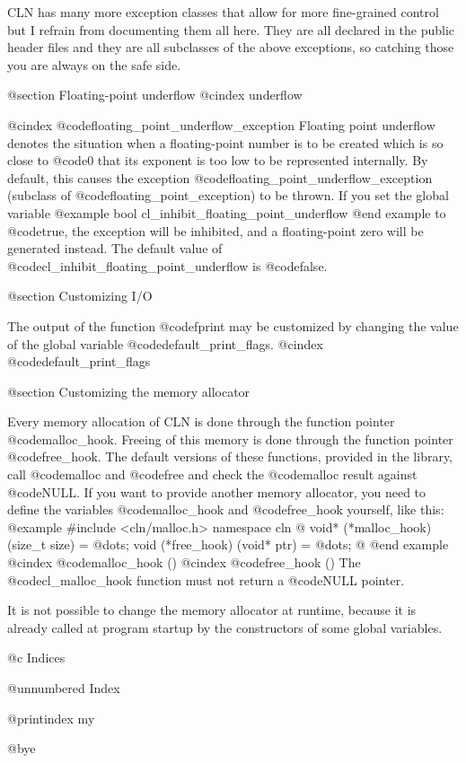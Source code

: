 CLN has many more exception classes that allow for more fine-grained
control but I refrain from documenting them all here. They are all
declared in the public header files and they are all subclasses of the
above exceptions, so catching those you are always on the safe side.


@section Floating-point underflow
@cindex underflow

@cindex @code{floating_point_underflow_exception}
Floating point underflow denotes the situation when a floating-point
number is to be created which is so close to @code{0} that its exponent
is too low to be represented internally. By default, this causes the
exception @code{floating_point_underflow_exception} (subclass of
@code{floating_point_exception}) to be thrown. If you set the global
variable
@example
bool cl_inhibit_floating_point_underflow
@end example
to @code{true}, the exception will be inhibited, and a floating-point
zero will be generated instead.  The default value of 
@code{cl_inhibit_floating_point_underflow} is @code{false}.


@section Customizing I/O

The output of the function @code{fprint} may be customized by changing the
value of the global variable @code{default_print_flags}.
@cindex @code{default_print_flags}


@section Customizing the memory allocator

Every memory allocation of CLN is done through the function pointer
@code{malloc_hook}. Freeing of this memory is done through the function
pointer @code{free_hook}. The default versions of these functions,
provided in the library, call @code{malloc} and @code{free} and check
the @code{malloc} result against @code{NULL}.
If you want to provide another memory allocator, you need to define
the variables @code{malloc_hook} and @code{free_hook} yourself,
like this:
@example
#include <cln/malloc.h>
namespace cln @{
        void* (*malloc_hook) (size_t size) = @dots{};
        void (*free_hook) (void* ptr)      = @dots{};
@}
@end example
@cindex @code{malloc_hook ()}
@cindex @code{free_hook ()}
The @code{cl_malloc_hook} function must not return a @code{NULL} pointer.

It is not possible to change the memory allocator at runtime, because
it is already called at program startup by the constructors of some
global variables.




@c Indices

@unnumbered Index

@printindex my


@bye
